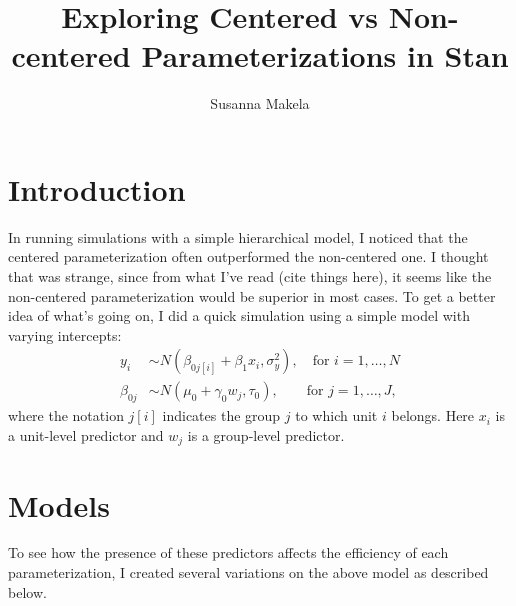 \documentclass[10pt,a4paper]{article}
\author{Susanna Makela}
\title{Exploring Centered vs Non-centered Parameterizations in Stan}
\begin{document}
\maketitle

\section*{Introduction}
In running simulations with a simple hierarchical model, I noticed that the centered parameterization often outperformed the non-centered one. I thought that was strange, since from what I've read (cite things here), it seems like the non-centered parameterization would be superior in most cases. To get a better idea of what's going on, I did a quick simulation using a simple model with varying intercepts:
\begin{align*}
	y_i &\sim N(\beta_{0j[i]} + \beta_1 x_i, \sigma_y^2), \quad \text{for } i = 1, \ldots, N \\[3pt]
	\beta_{0j} &\sim N(\mu_0 + \gamma_0 w_j, \tau_0), \quad \quad \text{for } j = 1, \ldots, J,
\end{align*}
where the notation $j[i]$ indicates the group $j$ to which unit $i$ belongs. Here $x_i$ is a unit-level predictor and $w_j$ is a group-level predictor.

\section*{Models}
To see how the presence of these predictors affects the efficiency of each parameterization, I created several variations on the above model as described below.
\end{document}
